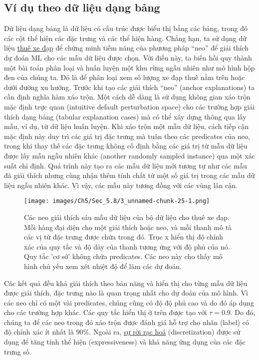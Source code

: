 \subsection{Ví dụ theo dữ liệu dạng bảng}
Dữ liệu dạng bảng là dữ liệu có cấu trúc được biểu thị bằng các bảng, trong đó các cột thể hiện các đặc trưng và các thể hiện hàng. Chẳng hạn, ta sử dụng dữ liệu \href{chap_3.1}{thuê xe đạp} để chứng minh tiềm năng của phương pháp “neo” để giải thích dự đoán ML cho các mẫu dữ liệu được chọn. Với điều này, ta biến hồi quy thành một bài toán phân loại và huấn luyện một khu rừng ngẫu nhiên như mô hình hộp đen của chúng ta. Đó là để phân loại xem số lượng xe đạp thuê nằm trên hoặc dưới đường xu hướng.
Trước khi tạo các giải thích “neo” (anchor explanations) ta cần định nghĩa hàm xáo trộn. Một cách dễ dàng là sử dụng không gian xáo trộn mặc định trực quan (intuitive default perturbation space) cho các trường hợp giải thích dạng bảng (tabular explanation cases) mà có thể xây dựng thông qua lấy mẫu, ví dụ, từ dữ liệu huấn luyện. Khi xáo trộn một mẫu dữ liệu, cách tiếp cận mặc định này duy trì các giá trị đặc trưng mà tuân theo các predicates của neo, trong khi thay thế các đặc trưng không cố định bằng các giá trị từ mẫu dữ liệu được lấy mẫu ngẫu nhiên khác (another randomly sampled instance) qua một xác suất chỉ định. Quá trình này tạo ra các mẫu dữ liệu mới tương tự như các mẫu đã giải thích nhưng cùng nhận thêm tính chất từ một số giá trị trong các mẫu dữ liệu ngẫu nhiên khác. Vì vậy, các mẫu này tương đồng với các vùng lân cận.
\begin{figure*}[h!]
	\centering
	\texttt{[image: images/Ch5/Sec\_5.8/3\_unnamed-chunk-25-1.png]}
	\label{fig:5_39}
	\caption{Các neo giải thích sáu mẫu dữ liệu của bộ dữ liệu cho thuê xe đạp. Mỗi hàng đại diện cho một giải thích hoặc neo, và mỗi thanh mô tả các vị từ đặc trưng được chứa trong đó. Trục x hiển thị độ chính xác của quy tắc và độ dày của thanh tương ứng với độ phủ của nó. Quy tắc 'cơ sở' không chứa predicates. Các neo này cho thấy mô hình chủ yếu xem xét nhiệt độ để làm các dự đoán.}
\end{figure*}
Các kết quả đều khả giải thích theo bản năng và hiển thị cho từng mẫu dữ liệu được giải thích, đặc trưng nào là quan trọng nhất cho dự đoán của mô hình. Vì các neo chỉ có một vài predicates, chúng cũng có độ độ phủ cao và do đó áp dụng cho các trường hợp khác. Các quy tắc hiển thị ở trên được tạo với $\tau = 0.9 $. Do đó, chúng ta để các neo trong đó xáo trộn được đánh giá hỗ trợ cho nhãn (label) có độ chính xác ít nhất là $90\%$. Ngoài ra, \href{ https://en.wiktionary.org/wiki/discretization}{sự rời rạc hoá} (discretization) được sử dụng để tăng tính thể hiện (expressiveness) và khả năng ứng dụng của các đặc trưng số.

